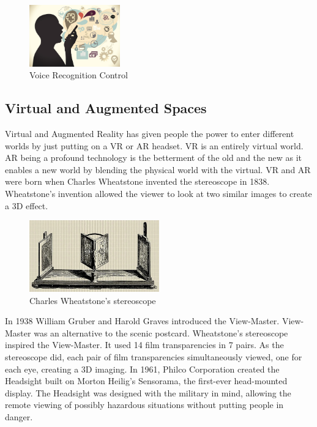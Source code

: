 \documentclass{article}
\begin{document}
\begin{figure}[!ht]
    \caption{Voice Recognition Control}
    \label{image:VRC}
    \centering
    \includegraphics[width=0.35\textwidth]{pics/vrc.jpg}
\end{figure}

\subsection{Virtual and Augmented Spaces}
Virtual and Augmented Reality has given people the power to enter different worlds by just putting on a VR or AR headset. VR is an entirely virtual world. AR being a profound technology is the betterment of the old and the new as it enables a new world by blending the physical world with the virtual. VR and AR were born when Charles Wheatstone invented the stereoscope in 1838. Wheatstone’s invention allowed the viewer to look at two similar images to create a 3D effect.
\cite{ref11}

\begin{figure}[!ht]
    \caption{Charles Wheatstone’s stereoscope}
    \label{image:stereoscope}
    \centering
    \includegraphics[width=0.5\textwidth]{pics/stereoscope.jpg}
\end{figure}

In 1938 William Gruber and Harold Graves introduced the View-Master.  View-Master was an alternative to the scenic postcard. Wheatstone’s stereoscope inspired the View-Master. It used 14 film transparencies in 7 pairs. As the stereoscope did, each pair of film transparencies simultaneously viewed, one for each eye, creating a 3D imaging. In 1961, Philco Corporation created the Headsight built on Morton Heilig's Sensorama, the first-ever head-mounted display. The Headsight was designed with the military in mind, allowing the remote viewing of possibly hazardous situations without putting people in danger.
\cite{ref11}
\end{document}
